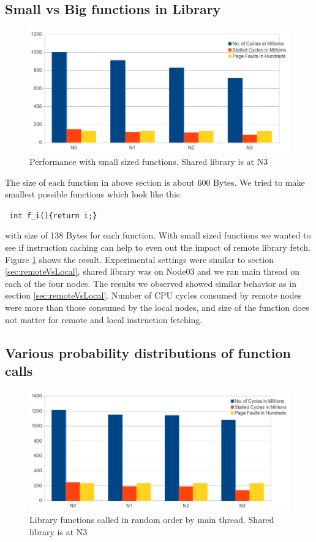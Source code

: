 \subsection{Small vs Big functions in Library}

\begin{figure}
    \centering
    \includegraphics[scale=0.38]{smallFunc.png}
    \caption{Performance with small sized functions. Shared library is at N3 }
    \label{fig:smallFunc}
\end{figure}

The size of each function in above section is about 600 Bytes.
We tried to make smallest possible functions which look like this:

\texttt{ int f_i()\{return i;\} }

with size of 138 Bytes for each function.
With small sized functions we wanted to see if instruction caching can help to even out the impact of remote library fetch.
Figure \ref{fig:smallFunc} shows the result.
Experimental settings were similar to section \ref{sec:remoteVsLocal}, shared library was on Node03 and we ran main thread on each of the four nodes.
The results we observed showed similar behavior as in section \ref{sec:remoteVsLocal}.
Number of CPU cycles consumed by remote nodes were more than those consumed by the local nodes, and size of the function does not matter for remote and local instruction fetching.



\subsection{Various probability distributions of function calls}

\begin{figure}
    \centering
    \includegraphics[scale=0.38]{randomDistribution.png}
    \caption{Library functions called in random order by main thread. Shared library is at N3 }
    \label{fig:randomDistribution}
\end{figure}

